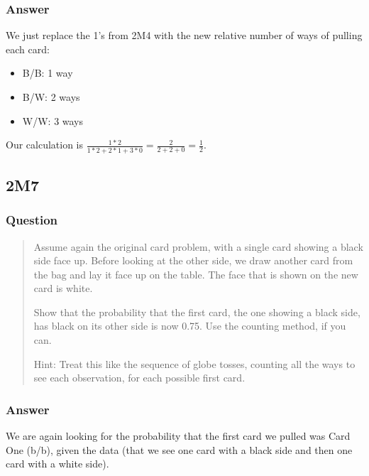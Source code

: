 \documentclass[
]{book}
\providecommand{\tightlist}{%
  \setlength{\itemsep}{0pt}\setlength{\parskip}{0pt}}
\begin{document}
\hypertarget{answer-9}{%
\subsubsection*{Answer}\label{answer-9}}

We just replace the 1's from 2M4 with the new relative number of ways of pulling each card:

\begin{itemize}
\tightlist
\item
  B/B: 1 way
\item
  B/W: 2 ways
\item
  W/W: 3 ways
\end{itemize}

Our calculation is \(\frac{1 * 2}{1 * 2 + 2 * 1 + 3 * 0} = \frac{2}{2+2+0} = \frac{1}{2}\).

\hypertarget{m7}{%
\subsection*{2M7}\label{m7}}

\hypertarget{question-10}{%
\subsubsection*{Question}\label{question-10}}

\begin{quote}
Assume again the original card problem, with a single card showing a black side face up. Before looking at the other side, we draw another card from the bag and lay it face up on the table. The face that is shown on the new card is white.

Show that the probability that the first card, the one showing a black side, has black on its other side is now 0.75. Use the counting method, if you can.

Hint: Treat this like the sequence of globe tosses, counting all the ways to see each observation, for each possible first card.
\end{quote}

\hypertarget{answer-10}{%
\subsubsection*{Answer}\label{answer-10}}

We are again looking for the probability that the first card we pulled was Card One (b/b), given the data (that we see one card with a black side and then one card with a white side).
\end{document}
